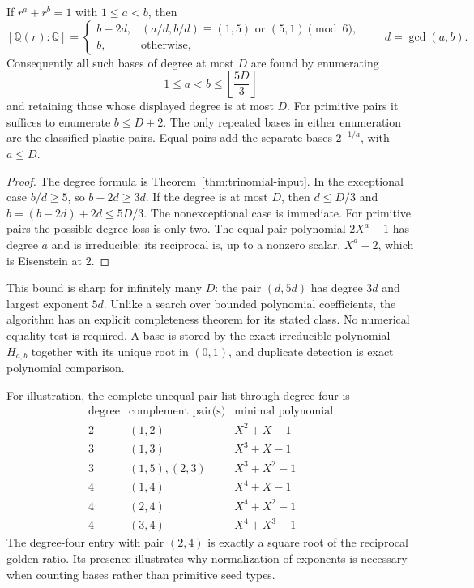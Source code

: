 \begin{corollary}
\label{cor:degree-search}
If $r^a+r^b=1$ with $1\le a<b$, then
\[
[\mathbb Q(r):\mathbb Q]=
\begin{cases}
b-2d,&(a/d,b/d)\equiv(1,5)\text{ or }(5,1)\pmod6,\\
b,&\text{otherwise},
\end{cases}
\qquad d=\gcd(a,b).
\]
Consequently all such bases of degree at most $D$ are found by
enumerating
\[
1\le a<b\le\left\lfloor\frac{5D}{3}\right\rfloor
\]
and retaining those whose displayed degree is at most $D$.
For primitive pairs it suffices to enumerate $b\le D+2$.
The only repeated bases in either enumeration are the classified
plastic pairs.  Equal pairs add the separate bases $2^{-1/a}$,
with $a\le D$.
\end{corollary}

\begin{proof}
The degree formula is Theorem~\ref{thm:trinomial-input}.  In the
exceptional case $b/d\ge5$, so $b-2d\ge3d$.  If the degree is
at most $D$, then $d\le D/3$ and
$b=(b-2d)+2d\le5D/3$.  The nonexceptional case is immediate.
For primitive pairs the possible degree loss is only two.
The equal-pair polynomial $2X^a-1$ has degree $a$ and is
irreducible: its reciprocal is, up to a nonzero scalar,
$X^a-2$, which is Eisenstein at $2$.
\end{proof}

This bound is sharp for infinitely many $D$: the pair $(d,5d)$
has degree $3d$ and largest exponent $5d$.
Unlike a search over bounded polynomial coefficients, the algorithm
has an explicit completeness theorem for its stated class.  No
numerical equality test is required.  A base is stored by the exact
irreducible polynomial $H_{a,b}$ together with its unique root in
$(0,1)$, and duplicate detection is exact polynomial comparison.

For illustration, the complete unequal-pair list through degree four is
\[
\begin{array}{ccl}
\text{degree}&\text{complement pair(s)}&\text{minimal polynomial}\\\hline
2&(1,2)&X^2+X-1\\
3&(1,3)&X^3+X-1\\
3&(1,5),(2,3)&X^3+X^2-1\\
4&(1,4)&X^4+X-1\\
4&(2,4)&X^4+X^2-1\\
4&(3,4)&X^4+X^3-1
\end{array}
\]
The degree-four entry with pair $(2,4)$ is exactly a square root of
the reciprocal golden ratio.  Its presence illustrates why normalization
of exponents is necessary when counting bases rather than primitive
seed types.

